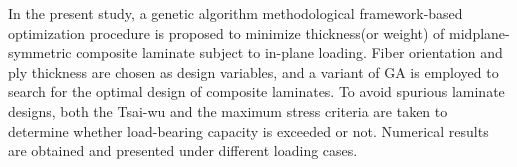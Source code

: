In the present study,  a genetic algorithm methodological framework-based
optimization procedure is proposed to minimize thickness(or weight) of
midplane-symmetric composite laminate subject to in-plane loading. Fiber
orientation and ply thickness are chosen as design variables, and a variant of GA is 
employed to search for the optimal design of composite laminates.  To avoid
spurious laminate designs, both the Tsai-wu and the maximum stress criteria are
taken to determine whether load-bearing capacity is exceeded or not. Numerical
results are obtained and presented under different loading cases.
